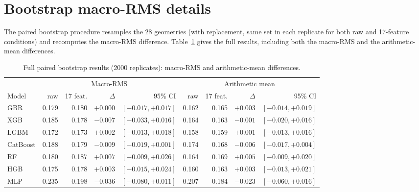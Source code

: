 \documentclass[12pt]{article}
\begin{document}
\section{Bootstrap macro-RMS details}
The paired bootstrap procedure resamples the 28 geometries (with replacement, same set in each replicate for both raw and 17-feature conditions) and recomputes the macro-RMS difference. Table~\ref{tab:bootstrap_app} gives the full results, including both the macro-RMS and the arithmetic-mean differences.

\begin{table}[!ht]\centering
\caption{Full paired bootstrap results (2000 replicates): macro-RMS and arithmetic-mean differences.}
\label{tab:bootstrap_app}\small
\begin{tabular}{lrrrrrrrr}
\toprule
& \multicolumn{4}{c}{Macro-RMS} & \multicolumn{4}{c}{Arithmetic mean} \\
\cmidrule(lr){2-5}\cmidrule(lr){6-9}
Model & raw & 17 feat. & $\Delta$ & 95\% CI & raw & 17 feat. & $\Delta$ & 95\% CI \\
\midrule
GBR      & 0.179 & 0.180 & $+0.000$ & $[-0.017, +0.017]$ & 0.162 & 0.165 & $+0.003$ & $[-0.014, +0.019]$ \\
XGB      & 0.185 & 0.178 & $-0.007$ & $[-0.033, +0.016]$ & 0.164 & 0.163 & $-0.001$ & $[-0.020, +0.016]$ \\
LGBM     & 0.172 & 0.173 & $+0.002$ & $[-0.013, +0.018]$ & 0.158 & 0.159 & $+0.001$ & $[-0.013, +0.016]$ \\
CatBoost & 0.188 & 0.179 & $-0.009$ & $[-0.019, +0.001]$ & 0.174 & 0.168 & $-0.006$ & $[-0.017, +0.004]$ \\
RF       & 0.180 & 0.187 & $+0.007$ & $[-0.009, +0.026]$ & 0.164 & 0.169 & $+0.005$ & $[-0.009, +0.020]$ \\
HGB      & 0.175 & 0.178 & $+0.003$ & $[-0.015, +0.024]$ & 0.160 & 0.163 & $+0.003$ & $[-0.013, +0.021]$ \\
MLP      & 0.235 & 0.198 & $-0.036$ & $[-0.080, +0.011]$ & 0.207 & 0.184 & $-0.023$ & $[-0.060, +0.016]$ \\
\bottomrule
\end{tabular}
\end{table}
\end{document}
